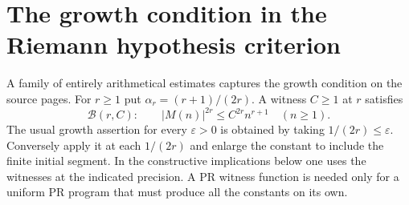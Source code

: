 \section{The growth condition in the Riemann hypothesis criterion}\label{sec:growth}

A family of entirely arithmetical estimates captures the growth condition on the source pages. For $r\ge1$ put $\alpha_r=(r+1)/(2r)$. A witness $C\ge1$ at $r$ satisfies
\[
 \mathcal B(r,C):\qquad
     |M(n)|^{2r}\le C^{2r}n^{r+1}\quad(n\ge1).
\]
The usual growth assertion for every $\varepsilon>0$ is obtained by taking $1/(2r)\le\varepsilon$. Conversely apply it at each $1/(2r)$ and enlarge the constant to include the finite initial segment. In the constructive implications below one uses the witnesses at the indicated precision. A PR witness function is needed only for a uniform PR program that must produce all the constants on its own.

